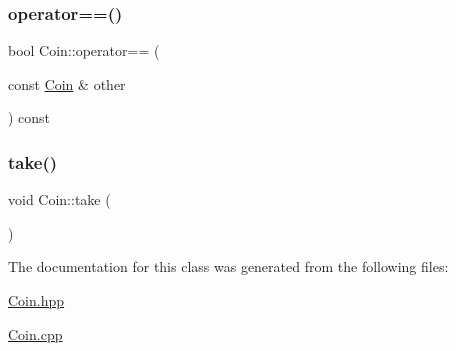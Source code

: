 \mbox{\label{class_coin_a803072934a3da4010352955208e14c4e}} 
\subsubsection{\texorpdfstring{operator==()}{operator==()}}
{\footnotesize\ttfamily bool Coin\+::operator== (\begin{DoxyParamCaption}\item[{const \mbox{\hyperlink{class_coin}{Coin}} \&}]{other }\end{DoxyParamCaption}) const}

\mbox{\label{class_coin_abdc8520a89656c688cc70cffa14265ca}} 
\subsubsection{\texorpdfstring{take()}{take()}}
{\footnotesize\ttfamily void Coin\+::take (\begin{DoxyParamCaption}{ }\end{DoxyParamCaption})}



The documentation for this class was generated from the following files\+:\begin{DoxyCompactItemize}
\item 
\mbox{\hyperlink{_coin_8hpp}{Coin.\+hpp}}\item 
\mbox{\hyperlink{_coin_8cpp}{Coin.\+cpp}}\end{DoxyCompactItemize}
